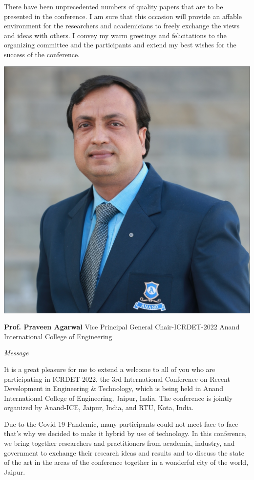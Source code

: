 \documentclass[twoside,11pt]{amsart}
\begin{document}
There have been unprecedented numbers of quality papers that are to be presented in the conference. I am sure that this occasion will provide an affable environment for the researchers and academicians to freely exchange the views and ideas with others. I convey my warm greetings and felicitations to the organizing committee and the participants and extend my best wishes for the success of the conference.
\vskip 5mm
\newpage
\vskip 1mm
\begin{flushright}
\includegraphics[height=8\baselineskip]{VP}
\end{flushright}
\vskip 1mm
\hfill \textbf{ Prof. Praveen Agarwal}
\vskip 1mm
\hfill Vice Principal
\vskip 1mm
\vskip 1mm
\hfill General Chair-ICRDET-2022
\vskip 1mm
\hfill Anand International College of Engineering
\vskip 10mm
\centerline {\huge{\emph{Message}}}
\vskip 10mm
It is a great pleasure for me to extend a welcome to all of you who are participating in ICRDET-2022, the 3rd International Conference on Recent Development in Engineering \& Technology, which is being held in Anand International College of Engineering, Jaipur, India. The conference is jointly organized by Anand-ICE, Jaipur, India, and RTU, Kota, India.

Due to the Covid-19 Pandemic, many participants could not meet face to face that’s why we decided to make it hybrid by use of technology. In this conference, we bring together researchers and practitioners from academia, industry, and government to exchange their research ideas and results and to discuss the state of the art in the areas of the conference together in a wonderful city of the world, Jaipur.
\end{document}
